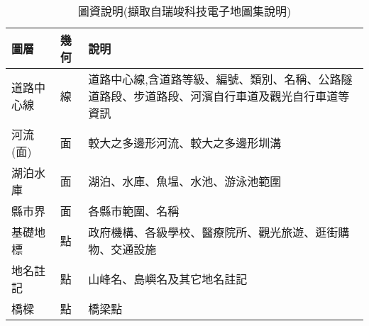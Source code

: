 \begin{table}[htbp]
\centering
\caption{圖資說明(擷取自瑞竣科技電子地圖集說明)}
\label{tab:layer}
\begin{adjustbox}{max width=\textwidth}
\renewcommand{\arraystretch}{1.4}
\begin{tabular}{>{\centering\arraybackslash}m{2.5cm} >{\centering\arraybackslash}m{1cm} >{\arraybackslash}m{10.5cm}}
\toprule
圖層 & 幾何 & 說明 \\
\toprule
道路中心線 & 線 & 道路中心線,含道路等級、編號、類別、名稱、公路隧道路段、步道路段、河濱自行車道及觀光自行車道等資訊 \\
\hline
河流(面) & 面 & 較大之多邊形河流、較大之多邊形圳溝 \\
\hline
湖泊水庫 & 面 & 湖泊、水庫、魚塭、水池、游泳池範圍 \\
\hline
縣市界 & 面 & 各縣市範圍、名稱 \\
\hline
基礎地標 & 點 & 政府機構、各級學校、醫療院所、觀光旅遊、逛街購物、交通設施 \\
\hline
地名註記 & 點 & 山峰名、島嶼名及其它地名註記 \\
\hline
橋樑 & 點 & 橋梁點 \\
\bottomrule
\end{tabular}
\end{adjustbox}
\end{table}